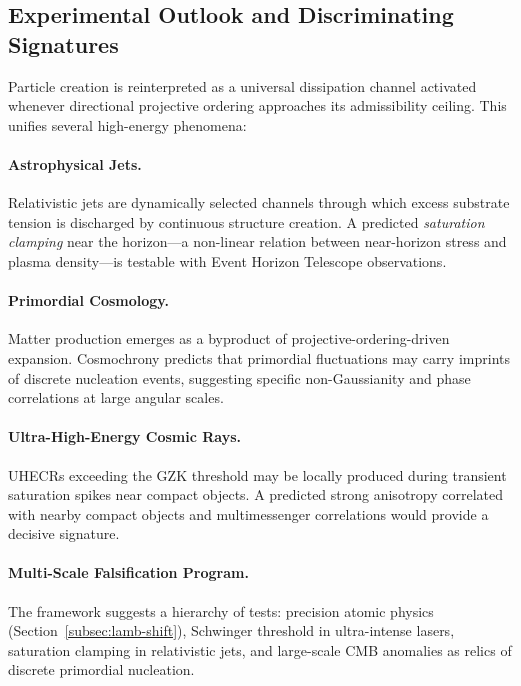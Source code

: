 \subsection{Experimental Outlook and Discriminating Signatures}
  \label{subsec:experimental-outlook-and-discriminating-signatures}

  Particle creation is reinterpreted as a universal dissipation channel
  activated whenever directional projective ordering approaches its admissibility ceiling.
  This unifies several high-energy phenomena:

  \paragraph{Astrophysical Jets.}
    Relativistic jets are dynamically selected channels through which excess
    substrate tension is discharged by continuous structure creation.
    A predicted \emph{saturation clamping} near the horizon---a non-linear
    relation between near-horizon stress and plasma density---is testable
    with Event Horizon Telescope observations.

  \paragraph{Primordial Cosmology.}
    Matter production emerges as a byproduct of projective-ordering-driven expansion.
    Cosmochrony predicts that primordial fluctuations may carry imprints of
    discrete nucleation events, suggesting specific non-Gaussianity and phase
    correlations at large angular scales.

  \paragraph{Ultra-High-Energy Cosmic Rays.}
    UHECRs exceeding the GZK threshold may be locally produced during
    transient saturation spikes near compact objects.
    A predicted strong anisotropy correlated with nearby compact objects and
    multimessenger correlations would provide a decisive signature.

  \paragraph{Multi-Scale Falsification Program.}
    The framework suggests a hierarchy of tests: precision atomic physics
    (Section~\ref{subsec:lamb-shift}), Schwinger threshold in ultra-intense
    lasers, saturation clamping in relativistic jets, and large-scale CMB
    anomalies as relics of discrete primordial nucleation.
